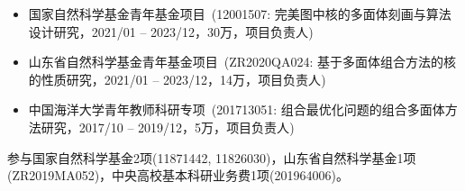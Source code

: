 %
%


{
\fontsize{9.15pt}{\baselineskip}\selectfont

\begin{itemize}[leftmargin=*]
	\item {国家自然科学基金青年基金项目}~(12001507: 完美图中核的多面体刻画与算法设计研究，2021/01 -- 2023/12，30万，{项目负责人})
	\item {山东省自然科学基金青年基金项目}~(ZR2020QA024: 基于多面体组合方法的核的性质研究，2021/01 -- 2023/12，14万，{项目负责人})
	\item {中国海洋大学青年教师科研专项}~(201713051: 组合最优化问题的组合多面体方法研究，2017/10 -- 2019/12，5万，{项目负责人})
\end{itemize}

参与国家自然科学基金2项(11871442, 11826030)，山东省自然科学基金1项(ZR2019MA052)，中央高校基本科研业务费1项(201964006)。
}
\iffalse
 \begin{tabular}{rl}	
	2021 -- 2023 & %
	{\hspace{-.5em}\textbf{国家自然科学基金青年基金项目}}~(12001507: 完美图中核的多面体刻画与算法设计研究)，\textbf{项目负责人}\\
	2020 -- 2023 & %
	{\hspace{-.5em}\textbf{山东省自然科学基金青年基金项目}}~(ZR2020QA024: 基于多面体组合方法的核的性质研究)，\textbf{项目负责人}\\
	2017 -- 2019 & %
	{\hspace{-.5em}\textbf{中国海洋大学青年教师科研专项}}~(201713051: 组合最优化问题的组合多面体方法研究)，\textbf{项目负责人}
\end{tabular}
\fi

